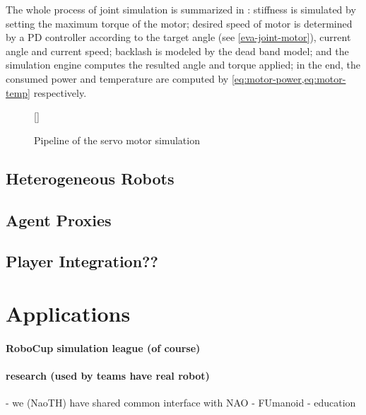 \documentclass{llncs}
\newcommand{\inputtikz}[1]
{
  \StrSubstitute{#1}{/}{.}[\fn]
  \scancs{\filename}{\fn}
  \tikzsetfigurename{\filename}
  
}
\begin{document}
The whole process of joint simulation is summarized in
: stiffness is simulated by setting the maximum torque of
the motor; desired speed of motor is determined by a PD controller
according to the target angle (see \cref{eva-joint-motor}), current angle and current speed; backlash
is modeled by the dead band model; and the simulation engine computes
the resulted angle and torque applied; in the end, the consumed power
and temperature are computed by \cref{eq:motor-power,eq:motor-temp}
respectively.
\begin{figure}
  \centering
  \inputtikz{joint}
  \caption{Pipeline of the servo motor simulation}
  \label{fig:joint}
\end{figure}

\subsection{Heterogeneous Robots}

\subsection{Agent Proxies}

\subsection{Player Integration??}

\section{Applications}

\paragraph{RoboCup simulation league (of course)}

\paragraph{research (used by teams have real robot)}
- we (NaoTH) have shared common interface with NAO
- FUmanoid
- education
\end{document}
